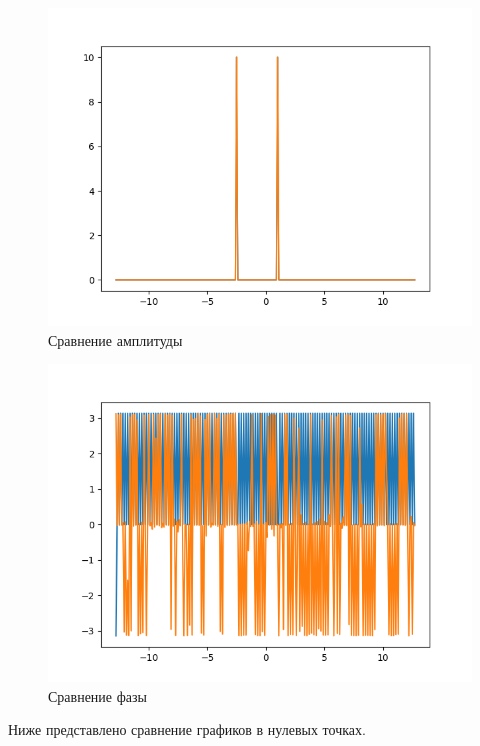{    
    \begin{figure}[H]
       \centering
            \includegraphics[width=\textwidth,height=\textheight,keepaspectratio]{Amplitude_test.png}
            \caption{Сравнение амплитуды}
    \end{figure}
    
     \begin{figure}[H]
       \centering
            \includegraphics[width=\textwidth,height=\textheight,keepaspectratio]{Phase_test.png}
            \caption{Сравнение фазы}
    \end{figure}
        
    Ниже представлено сравнение графиков в нулевых точках.       
       
}
